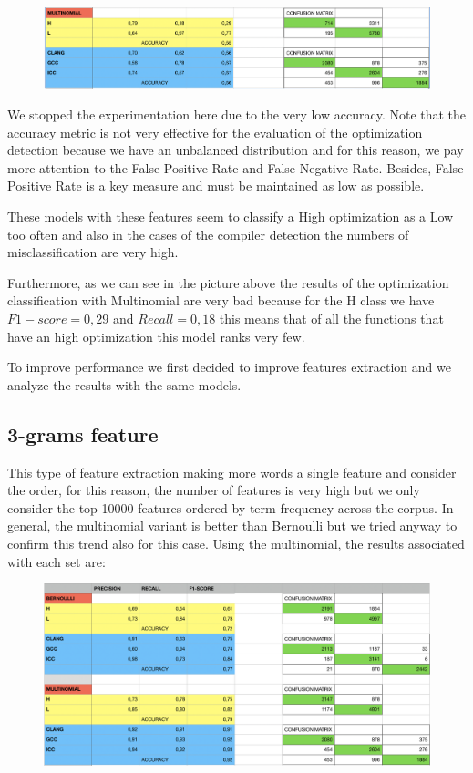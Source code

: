 \documentclass[12pt]{article}
\begin{document}
\begin{figure}[!ht]
 \includegraphics[width=1\textwidth]{pic4}
 \label{fig: Multinomial with 1-gram}
\end{figure}
\newpage

We stopped the experimentation here due to the very low accuracy. Note that the accuracy metric is not very effective for the evaluation of the optimization detection because we have an unbalanced distribution and for this reason, we pay more attention to the False Positive Rate and False Negative Rate. Besides, False Positive Rate is a key measure and must be maintained as low as possible.

These models with these features seem to classify a High optimization as a Low too often and also in the cases of the compiler detection the numbers of misclassification are very high.

Furthermore, as we can see in the picture above the results of the optimization classification with Multinomial are very bad because for the H class we have
$F1-score = 0,29$ and $Recall = 0,18$ this means that of all the functions that have an high optimization this model ranks very few.

To improve performance we first decided to improve features extraction and we analyze the results with the same models.

\subsection{3-grams feature}
This type of feature extraction making more words a single feature and consider the order, for this reason, the number of features is very high but we only consider the top 10000 features ordered by term frequency across the corpus.
In general, the multinomial variant is better than Bernoulli but we tried anyway to confirm this trend also for this case.
Using the multinomial, the results associated with each set are:

\begin{figure}[!ht]
 \includegraphics[width=1\textwidth]{pic5}
 \label{fig: Bernoulli and Multinomial with 3-grams}
\end{figure}
\end{document}
